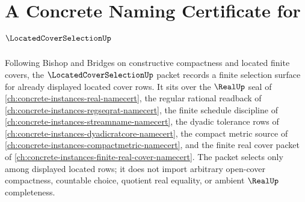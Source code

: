 \chapter{A Concrete Naming Certificate for $\LocatedCoverSelectionUp$}
\label{ch:concrete-instances-located-cover-selection-namecert}

Following Bishop and Bridges on constructive compactness and located finite covers, the $\LocatedCoverSelectionUp$ packet records a finite selection surface for already displayed located cover rows. It sits over the $\RealUp$ seal of \autoref{ch:concrete-instances-real-namecert}, the regular rational readback of \autoref{ch:concrete-instances-regseqrat-namecert}, the finite schedule discipline of \autoref{ch:concrete-instances-streamname-namecert}, the dyadic tolerance rows of \autoref{ch:concrete-instances-dyadicratcore-namecert}, the compact metric source of \autoref{ch:concrete-instances-compactmetric-namecert}, and the finite real cover packet of \autoref{ch:concrete-instances-finite-real-cover-namecert}. The packet selects only among displayed located rows; it does not import arbitrary open-cover compactness, countable choice, quotient real equality, or ambient $\RealUp$ completeness.


